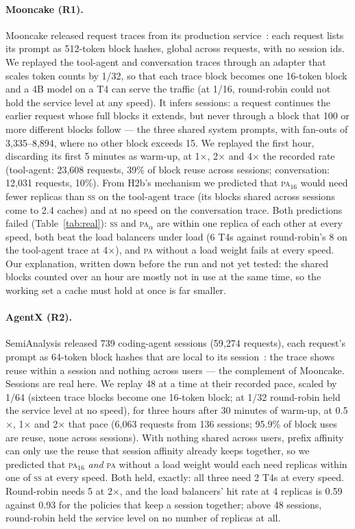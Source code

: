 \documentclass[10pt,twocolumn]{article}
\newcommand{\PA}{\textsc{pa}}
\newcommand{\SSt}{\textsc{ss}}
\begin{document}
\paragraph{Mooncake (R1).} Mooncake released request traces from its production
service~\cite{mooncaketraces}: each request lists its prompt as 512-token block hashes, global across
requests, with no session ids. We replayed the tool-agent and conversation traces through an adapter
that scales token counts by 1/32, so that each trace block becomes one 16-token block and a 4B model
on a T4 can serve the traffic (at 1/16, round-robin could not hold the service level at any speed).
It infers sessions: a request continues the earlier request whose full blocks it extends, but never
through a block that 100 or more different blocks follow --- the three shared system prompts, with
fan-outs of 3{,}335--8{,}894, where no other block exceeds 15. We replayed the first hour, discarding
its first 5 minutes as warm-up, at 1$\times$, 2$\times$ and 4$\times$ the recorded rate (tool-agent:
23{,}608 requests, 39\% of block reuse across sessions; conversation: 12{,}031 requests, 10\%). From
H2b's mechanism we predicted that \PA$_{16}$ would need fewer replicas than \SSt{} on the tool-agent
trace (its blocks shared across sessions come to 2.4 caches) and at no speed on the conversation
trace. Both predictions failed (Table~\ref{tab:real}): \SSt{} and \PA$_\alpha$ are within one replica
of each other at every speed, both beat the load balancers under load (6 T4s against round-robin's 8
on the tool-agent trace at 4$\times$), and \PA{} without a load weight fails at every speed. Our
explanation, written down before the run and not yet tested: the shared blocks counted over an hour
are mostly not in use at the same time, so the working set a cache must hold at once is far smaller.

\paragraph{AgentX (R2).} SemiAnalysis released 739 coding-agent sessions (59{,}274 requests), each
request's prompt as 64-token block hashes that are local to its session~\cite{agentx}: the trace shows
reuse within a session and nothing across users --- the complement of Mooncake. Sessions are real
here. We replay 48 at a time at their recorded pace, scaled by 1/64 (sixteen trace blocks become one
16-token block; at 1/32 round-robin held the service level at no speed), for three hours after 30
minutes of warm-up, at 0.5$\times$, 1$\times$ and 2$\times$ that pace (6{,}063 requests from 136
sessions; 95.9\% of block uses are reuse, none across sessions). With nothing shared across users,
prefix affinity can only use the reuse that session affinity already keeps together, so we predicted
that \PA$_{16}$ \emph{and} \PA{} without a load weight would each need replicas within one of \SSt{}
at every speed. Both held, exactly: all three need 2 T4s at every speed. Round-robin needs 5 at
2$\times$, and the load balancers' hit rate at 4 replicas is 0.59 against 0.93 for the policies that
keep a session together; above 48 sessions, round-robin held the service level on no number of
replicas at all.
\end{document}
